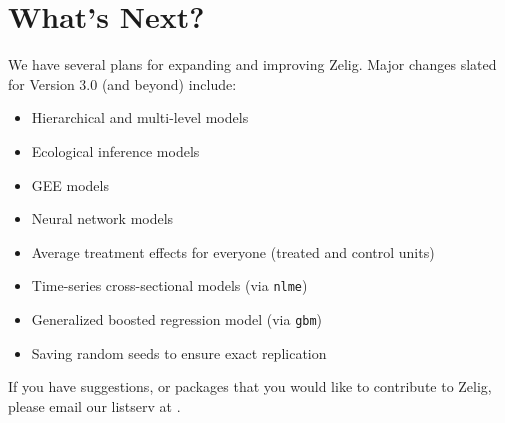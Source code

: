 \section{What's Next?}

We have several plans for expanding and improving Zelig.  Major
changes slated for Version 3.0 (and beyond) include:  

\begin{itemize}
\item Hierarchical and multi-level models
\item Ecological inference models
\item GEE models
\item Neural network models
\item Average treatment effects for everyone (treated and control
units)
\item Time-series cross-sectional models (via {\tt nlme})
\item Generalized boosted regression model (via {\tt gbm})
\item Saving random seeds to ensure exact replication
\end{itemize}

If you have suggestions, or packages that you would like to contribute
to Zelig, please email our listserv at .
